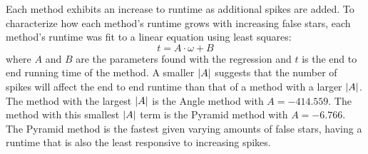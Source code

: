 %
%
%
Each method exhibits an increase to runtime as additional spikes are added.
To characterize how each method's runtime grows with increasing false stars, each method's runtime was fit to a linear
equation using least squares:
\begin{equation}
    t = A\cdot\omega + B
\end{equation}
where $A$ and $B$ are the parameters found with the regression and $t$ is the end to end running time of the method.
A smaller $\left| A \right|$ suggests that the number of spikes will affect the end to end runtime than that of a method with a
larger $\left| A \right|$.
The method with the largest $\left| A \right|$ is the Angle method with $A = -414.559$.
The method with this smallest $\left| A \right|$ term is the Pyramid method with $A = -6.766$.
The Pyramid method is the fastest given varying amounts of false stars, having a runtime that is also the least
responsive to increasing spikes.

